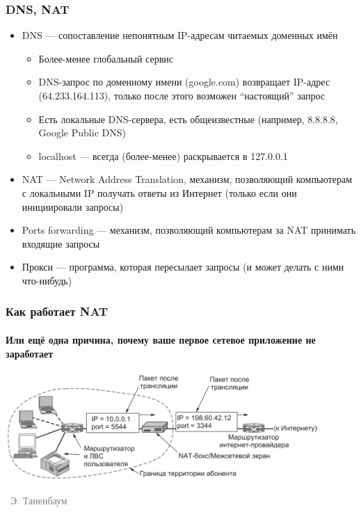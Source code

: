 \documentclass[xetex,mathserif,serif]{beamer}
\newcommand{\attribution}[1] {
\vspace{-5mm}\begin{flushright}\begin{scriptsize}\textcolor{gray}{\textcopyright\, #1}\end{scriptsize}\end{flushright}
}
\begin{document}
    \begin{frame}
        \frametitle{DNS, NAT}
        \begin{itemize}
            \item DNS --- сопоставление непонятным IP-адресам читаемых доменных имён
            \begin{itemize}
                \item Более-менее глобальный сервис
                \item DNS-запрос по доменному имени (google.com) возвращает IP-адрес (64.233.164.113), только после этого возможен ``настоящий'' запрос
                \item Есть локальные DNS-сервера, есть общеизвестные (например, 8.8.8.8, Google Public DNS)
                \item localhost --- всегда (более-менее) раскрывается в 127.0.0.1
            \end{itemize}
            \item NAT --- Network Address Translation, механизм, позволяющий компьютерам с локальными IP получать ответы из Интернет (только если они инициировали запросы)
            \item Ports forwarding --- механизм, позволяющий компьютерам за NAT принимать входящие запросы
            \item Прокси --- программа, которая пересылает запросы (и может делать с ними что-нибудь)
        \end{itemize}
    \end{frame}

    \begin{frame}
        \frametitle{Как работает NAT}
        \framesubtitle{Или ещё одна причина, почему ваше первое сетевое приложение не заработает}
        \begin{center}
            \includegraphics[width=0.9\textwidth]{nat.png}
            \attribution{Э. Таненбаум}
        \end{center}
    \end{frame}
\end{document}
